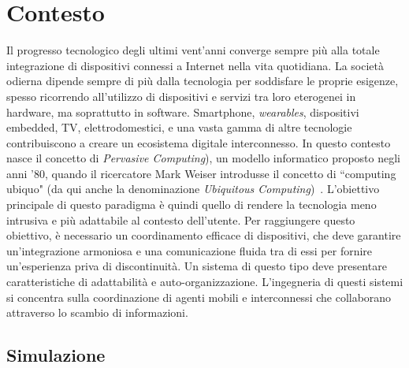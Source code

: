 \section{Contesto}
Il progresso tecnologico degli ultimi vent'anni converge sempre più alla totale integrazione di dispositivi connessi a Internet nella vita quotidiana. La società odierna dipende sempre di più dalla tecnologia per soddisfare le proprie esigenze, spesso ricorrendo all'utilizzo di dispositivi e servizi tra loro eterogenei in hardware, ma soprattutto in software. Smartphone, \textit{wearables}, dispositivi embedded, TV, elettrodomestici, e una vasta gamma di altre tecnologie contribuiscono a creare un ecosistema digitale interconnesso. In questo contesto nasce il concetto di \textit{Pervasive Computing}), un modello informatico proposto negli anni '80, quando il ricercatore Mark Weiser introdusse il concetto di ``computing ubiquo" (da qui anche la denominazione \textit{Ubiquitous Computing})~\cite{Weiser2002}.
L'obiettivo principale di questo paradigma è quindi quello di rendere la tecnologia meno intrusiva e più adattabile al contesto dell'utente.   Per raggiungere questo obiettivo, è necessario un coordinamento efficace di dispositivi, che deve garantire un'integrazione armoniosa e una comunicazione fluida tra di essi per fornire un'esperienza priva di discontinuità. Un sistema di questo tipo deve presentare caratteristiche di adattabilità e auto-organizzazione.
L'ingegneria di questi sistemi si concentra sulla coordinazione di agenti mobili e interconnessi che collaborano attraverso lo scambio di informazioni.
\subsection{Simulazione}

